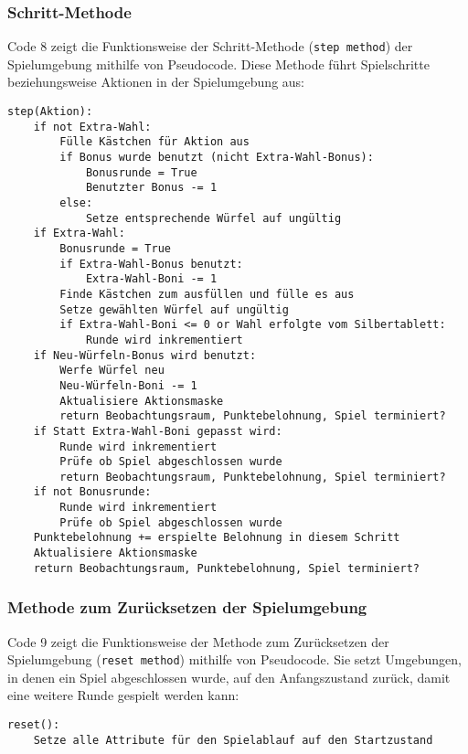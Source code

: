 \subsubsection{Schritt-Methode}
\begin{minipage}{\linewidth}
Code 8 zeigt die Funktionsweise der Schritt-Methode (\texttt{step method}) der Spielumgebung mithilfe von Pseudocode. Diese Methode führt Spielschritte beziehungsweise Aktionen in der Spielumgebung aus:
\vspace{0.5cm}
\begin{lstlisting}[caption={Schritt-Methode},morekeywords={Aktion}]
step(Aktion):
	if not Extra-Wahl:
		Fülle Kästchen für Aktion aus
		if Bonus wurde benutzt (nicht Extra-Wahl-Bonus):
			Bonusrunde = True
			Benutzter Bonus -= 1
		else:
			Setze entsprechende Würfel auf ungültig
	if Extra-Wahl:
		Bonusrunde = True
		if Extra-Wahl-Bonus benutzt:
			Extra-Wahl-Boni -= 1
		Finde Kästchen zum ausfüllen und fülle es aus
		Setze gewählten Würfel auf ungültig
		if Extra-Wahl-Boni <= 0 or Wahl erfolgte vom Silbertablett:
			Runde wird inkrementiert
	if Neu-Würfeln-Bonus wird benutzt:
		Werfe Würfel neu
		Neu-Würfeln-Boni -= 1
		Aktualisiere Aktionsmaske
		return Beobachtungsraum, Punktebelohnung, Spiel terminiert?
	if Statt Extra-Wahl-Boni gepasst wird:
		Runde wird inkrementiert
		Prüfe ob Spiel abgeschlossen wurde
		return Beobachtungsraum, Punktebelohnung, Spiel terminiert?
	if not Bonusrunde:
		Runde wird inkrementiert
		Prüfe ob Spiel abgeschlossen wurde
	Punktebelohnung += erspielte Belohnung in diesem Schritt
	Aktualisiere Aktionsmaske
	return Beobachtungsraum, Punktebelohnung, Spiel terminiert?		
\end{lstlisting}
\end{minipage}
\subsubsection{Methode zum Zurücksetzen der Spielumgebung}
\begin{minipage}{\linewidth}
Code 9 zeigt die Funktionsweise der Methode zum Zurücksetzen der Spielumgebung (\texttt{reset method}) mithilfe von Pseudocode. Sie setzt Umgebungen, in denen ein Spiel abgeschlossen wurde, auf den Anfangszustand zurück, damit eine weitere Runde gespielt werden kann:
\vspace{0.5cm}
\begin{lstlisting}[caption={Methode zum Zurücksetzen der Umgebung}]
reset():
	Setze alle Attribute für den Spielablauf auf den Startzustand
\end{lstlisting}
\end{minipage}


